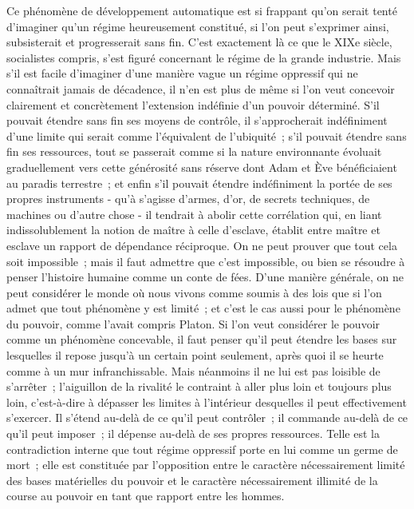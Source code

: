 \documentclass[french,twoside]{book} %
\begin{document}
Ce phénomène de développement automatique est si frappant qu'on serait tenté d'imaginer qu'un régime heureusement constitué, si l'on peut s'exprimer ainsi, subsisterait et progresserait sans fin. C'est exactement là ce que le XIXe siècle, socialistes compris, s'est figuré concernant le régime de la grande industrie. Mais s'il est facile d'imaginer d'une manière vague un régime oppressif qui ne connaîtrait jamais de décadence, il n'en est plus de même si l'on veut concevoir clairement et concrètement l'extension indéfinie d'un pouvoir déterminé. S'il pouvait étendre sans fin ses moyens de contrôle, il s'approcherait indéfiniment d'une limite qui serait comme l'équivalent de l'ubiquité ; s'il pouvait étendre sans fin ses ressources, tout se passerait comme si la nature environnante évoluait graduellement vers cette générosité sans réserve dont Adam et Ève bénéficiaient au paradis terrestre ; et enfin s'il pouvait étendre indéfiniment la portée de ses propres instruments - qu'à s'agisse d'armes, d'or, de secrets techniques, de machines ou d'autre chose - il tendrait à abolir cette corrélation qui, en liant indissolublement la notion de maître à celle d'esclave, établit entre maître et esclave un rapport de dépendance réciproque. On ne peut prouver que tout cela soit impossible ; mais il faut admettre que c'est impossible, ou bien se résoudre à penser l'histoire humaine comme un conte de fées. D'une manière générale, on ne peut considérer le monde où nous vivons comme soumis à des lois que si l'on admet que tout phénomène y est limité ; et c'est le cas aussi pour le phénomène du pouvoir, comme l'avait compris Platon. Si l'on veut considérer le pouvoir comme un phénomène concevable, il faut penser qu'il peut étendre les bases sur lesquelles il repose jusqu'à un certain point seulement, après quoi il se heurte comme à un mur infranchissable. Mais néanmoins il ne lui est pas loisible de s'arrêter ; l'aiguillon de la rivalité le contraint à aller plus loin et toujours plus loin, c'est-à-dire à dépasser les limites à l'intérieur desquelles il peut effectivement s'exercer. Il s'étend au-delà de ce qu'il peut contrôler ; il commande au-delà de ce qu'il peut imposer ; il dépense au-delà de ses propres ressources. Telle est la contradiction interne que tout régime oppressif porte en lui comme un germe de mort ; elle est constituée par l'opposition entre le caractère nécessairement limité des bases matérielles du pouvoir et le caractère nécessairement illimité de la course au pouvoir en tant que rapport entre les hommes.\par
\end{document}
